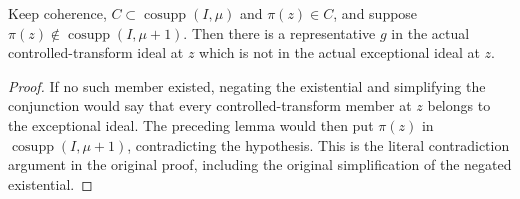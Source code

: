 \begin{lemma}
\label{pub:controlled-member-outside-exceptional}
\notready
Keep coherence, $C\subset\operatorname{cosupp}(I,\mu)$ and $\pi(z)\in C$,
and suppose $\pi(z)\notin\operatorname{cosupp}(I,\mu+1)$. Then there is a
representative $g$ in the actual controlled-transform ideal at $z$ which is
not in the actual exceptional ideal at $z$.
\end{lemma}
\begin{proof}
If no such member existed, negating the existential and simplifying the
conjunction would say that every controlled-transform member at $z$ belongs
to the exceptional ideal. The preceding lemma would then put $\pi(z)$ in
$\operatorname{cosupp}(I,\mu+1)$, contradicting the hypothesis. This is the
literal contradiction argument in the original proof, including the original
simplification of the negated existential.
\end{proof}
